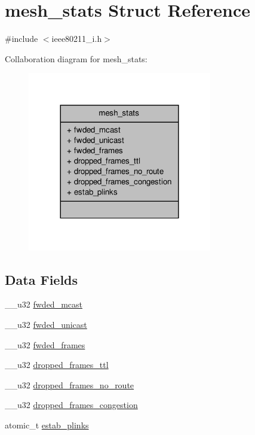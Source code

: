 \hypertarget{structmesh__stats}{\section{mesh\-\_\-stats Struct Reference}
\label{structmesh__stats}
}


{\ttfamily \#include $<$ieee80211\-\_\-i.\-h$>$}



Collaboration diagram for mesh\-\_\-stats\-:
\nopagebreak
\begin{figure}[H]
\begin{center}
\leavevmode
\includegraphics[width=228pt]{structmesh__stats__coll__graph}
\end{center}
\end{figure}
\subsection*{Data Fields}
\begin{DoxyCompactItemize}
\item 
\-\_\-\-\_\-u32 \hyperlink{structmesh__stats_a891b0def69cd36d51778d0688b7f312f}{fwded\-\_\-mcast}
\item 
\-\_\-\-\_\-u32 \hyperlink{structmesh__stats_a9e49222edd33b4bfe5705350a6d0938c}{fwded\-\_\-unicast}
\item 
\-\_\-\-\_\-u32 \hyperlink{structmesh__stats_a49a415a93a4c3e6864addddb23fd0d48}{fwded\-\_\-frames}
\item 
\-\_\-\-\_\-u32 \hyperlink{structmesh__stats_a4db3368b16b6cd0d3863947e74f3b968}{dropped\-\_\-frames\-\_\-ttl}
\item 
\-\_\-\-\_\-u32 \hyperlink{structmesh__stats_a41875880a535ab024bd05d2f5f26102c}{dropped\-\_\-frames\-\_\-no\-\_\-route}
\item 
\-\_\-\-\_\-u32 \hyperlink{structmesh__stats_add8222dd9919110e1c8395ad1a4f6110}{dropped\-\_\-frames\-\_\-congestion}
\item 
atomic\-\_\-t \hyperlink{structmesh__stats_a2e422d4c51c64bc57262ef857ee71127}{estab\-\_\-plinks}
\end{DoxyCompactItemize}


